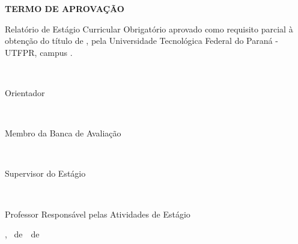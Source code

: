 \makeatletter

\begin{center}
	\Large\textbf{\MakeUppercase{Termo de Aprovação}}
\end{center}

\begin{center}
	\large{\MakeUppercase{\@author}}
\end{center}

\vspace{2\baselineskip plus 1.5\baselineskip minus 0.5\baselineskip}

\begin{center}
	Relatório de Estágio Curricular Obrigatório aprovado como requisito parcial à obtenção do título de \MakeUppercase{\@titulo}, pela Universidade Tecnológica Federal do Paraná - UTFPR, campus \@cidade.
\end{center}

\vspace{2\baselineskip plus 1.5\baselineskip minus 0.5\baselineskip}

\begin{flushright}%
		\@orientador\\
		\begin{flushright}
			Orientador
		\end{flushright}		
\end{flushright}

\vspace{2\baselineskip plus 1.5\baselineskip minus 0.5\baselineskip}

\begin{flushright}%
		\@avaliador\\
		\begin{flushright}
			Membro da Banca de Avaliação
		\end{flushright}		
\end{flushright}

\vspace{2\baselineskip plus 1.5\baselineskip minus 0.5\baselineskip}

\begin{flushright}%
		\@supervisor\\
		\begin{flushright}
			Supervisor do Estágio
		\end{flushright}		
\end{flushright}

\vspace{2\baselineskip plus 1.5\baselineskip minus 0.5\baselineskip}

\begin{flushright}%
		\@prae\\\vspace{-0.5cm}
		\begin{flushright}
			Professor Responsável pelas Atividades de Estágio
		\end{flushright}		
\end{flushright}

\vfill%
\begin{center}
	\@cidade, \@diaDefesa~de~\@mesDefesa~de~\anovalor
\end{center}

